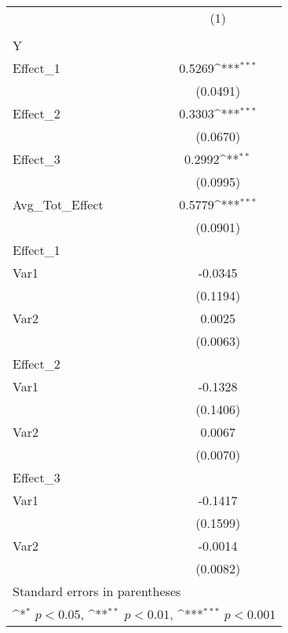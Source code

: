 \documentclass[varwidth]{standalone}
\begin{document}
{
\def\sym#1{\ifmmode^{#1}\else\(^{#1}\)\fi}
\begin{tabular}{l*{1}{c}}
\toprule
            &\multicolumn{1}{c}{(1)}\\
            &\multicolumn{1}{c}{} \\
\midrule
Y           &                     \\
Effect\_1    &      0.5269\sym{***}\\
            &    (0.0491)         \\
\addlinespace
Effect\_2    &      0.3303\sym{***}\\
            &    (0.0670)         \\
\addlinespace
Effect\_3    &      0.2992\sym{**} \\
            &    (0.0995)         \\
\addlinespace
Avg\_Tot\_Effect&      0.5779\sym{***}\\
            &    (0.0901)         \\
\midrule
Effect\_1    &                     \\
Var1        &     -0.0345         \\
            &    (0.1194)         \\
\addlinespace
Var2        &      0.0025         \\
            &    (0.0063)         \\
\midrule
Effect\_2    &                     \\
Var1        &     -0.1328         \\
            &    (0.1406)         \\
\addlinespace
Var2        &      0.0067         \\
            &    (0.0070)         \\
\midrule
Effect\_3    &                     \\
Var1        &     -0.1417         \\
            &    (0.1599)         \\
\addlinespace
Var2        &     -0.0014         \\
            &    (0.0082)         \\
\bottomrule
\multicolumn{2}{l}{\footnotesize Standard errors in parentheses}\\
\multicolumn{2}{l}{\footnotesize \sym{*} \(p<0.05\), \sym{**} \(p<0.01\), \sym{***} \(p<0.001\)}\\
\end{tabular}
}
\end{document}
